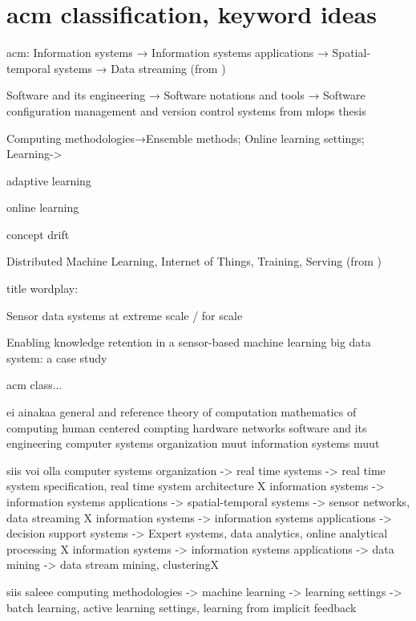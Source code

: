 \section{acm classification,  keyword ideas}

acm:
Information systems → Information systems applications →
Spatial-temporal systems → Data streaming (from \cite{uprctrajectorysystem})

Software and its engineering → Software notations and tools → Software configuration management and version control systems from mlops thesis

 Computing methodologies→Ensemble methods; Online learning settings;
 Learning->

adaptive learning

online learning

concept drift


Distributed Machine Learning, Internet of Things, Training, Serving (from \cite{mliot})

title wordplay:

Sensor data systems at extreme scale / for scale

Enabling knowledge retention in a sensor-based machine learning big data system: a case study


acm class...

ei ainakaa
general and reference
theory of computation
mathematics of computing
human centered compting
hardware
networks
software and its engineering
computer systems organization muut
information systems muut

siis voi olla
computer systems organization -> real time systems -> real time system specification, real time system architecture X
information systems -> information systems applications -> spatial-temporal systems -> sensor networks, data streaming X
information systems -> information systems applications -> decision support systems -> Expert systems, data analytics, online analytical processing X
information systems -> information systems applications -> data mining -> data stream mining, clusteringX

siis saleee
computing methodologies -> machine learning -> learning settings -> batch learning, active learning settings, learning from implicit feedback